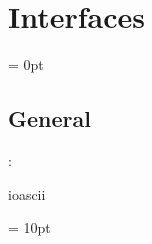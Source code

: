 
\section{Interfaces} 


\parskip = 0pt

\vspace{3mm} \subsection*{General}

: 

ioascii
\vspace{2mm}

\vspace{5mm}\parskip = 10pt 
